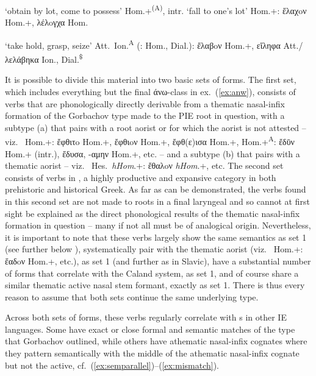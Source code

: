 \documentclass[output=paper,colorlinks,citecolor=brown]{langscibook}
\begin{document}
\begin{exe}
\begin{xlist}
\ex  {}  ‘obtain by lot, come to possess’ Hom.+\textsuperscript{(A)}, intr. ‘fall to one’s lot’ Hom.+: ἔλαχoν Hom.+, λέλoγχα Hom.

\ex  {}  ‘take hold, grasp, seize’ Att.\ Ion.\textsuperscript{A} (:  Hom., Dial.): ἔλαβoν Hom.+, εἴληφα Att./λελάβηκα Ion., Dial.\textsuperscript{\$} 
\end{xlist}
\end{exe}




It is possible to divide this material into two basic sets of forms. The first set, which includes everything but the final άνω-class in ex.\ (\ref{ex:anw}), consists of verbs that are phonologically directly derivable from a thematic nasal-infix formation of the Gorbachov type made to the PIE root in question, with a subtype (a) that pairs with a root aorist or for which the aorist is not attested -- viz.\   Hom.+: ἔφθιτo Hom.+, ἔφθιoν Hom.+, ἔφθ(ε)ισα Hom.+,   Hom.+\textsuperscript{A}: ἔδῡν Hom.+ (intr.), ἔδυσα, -αμην Hom.+, etc. -- and a subtype (b) that pairs with a thematic aorist -- viz.\   Hes.\ \textit{hHom}.+: ἔθαλoν \textit{hHom}.+, etc. The second set consists of verbs in , a highly productive and expansive category in both prehistoric and historical Greek. As far as can be demonstrated, the verbs found in this second set are not made to roots in a final laryngeal and so cannot at first sight be explained as the direct phonological results of the thematic nasal-infix formation in question -- many if not all must be of analogical origin. Nevertheless, it is important to note that these verbs largely show the same semantics as set 1 (see further below ),  systematically pair with the thematic aorist (viz.\   Hom.+: ἕαδoν Hom.+, etc.), as set 1 (and further as in Slavic), have a substantial number of forms that correlate with the Caland system,  as set 1, and of course share a similar thematic active nasal stem formant, exactly as set 1. There is thus every reason to assume that both sets continue the same underlying type.

Across both sets of forms, these verbs regularly correlate with s in other IE languages. Some have exact or close formal and semantic matches of the type that Gorbachov outlined, while others have athematic nasal-infix cognates  where they pattern semantically with the  middle of the athematic nasal-infix cognate but not the  active, cf.\ (\ref{ex:semparallel})--(\ref{ex:mismatch}).
\end{document}
